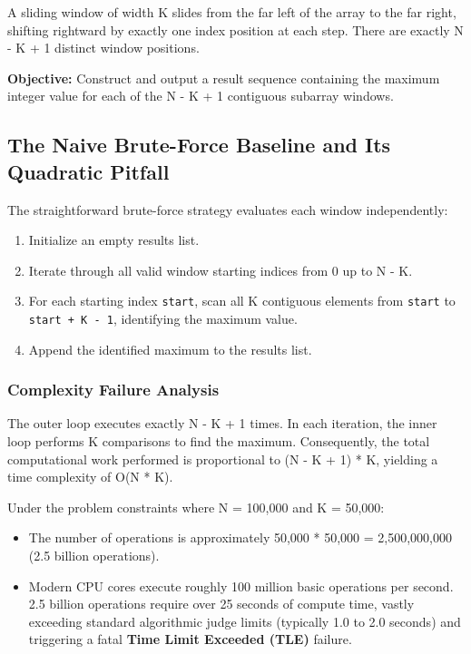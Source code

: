 \documentclass[10pt,journal,compsoc,onecolumn]{IEEEtran}
\begin{document}
A sliding window of width K slides from the far left of the array to the far right, shifting rightward by exactly one index position at each step. There are exactly N - K + 1 distinct window positions.

\textbf{Objective:} Construct and output a result sequence containing the maximum integer value for each of the N - K + 1 contiguous subarray windows.

\subsection{The Naive Brute-Force Baseline and Its Quadratic Pitfall}

The straightforward brute-force strategy evaluates each window independently:
\begin{enumerate}
    \item Initialize an empty results list.
    \item Iterate through all valid window starting indices from 0 up to N - K.
    \item For each starting index \texttt{start}, scan all K contiguous elements from \texttt{start} to \texttt{start + K - 1}, identifying the maximum value.
    \item Append the identified maximum to the results list.
\end{enumerate}

\subsubsection{Complexity Failure Analysis}
The outer loop executes exactly N - K + 1 times. In each iteration, the inner loop performs K comparisons to find the maximum. Consequently, the total computational work performed is proportional to (N - K + 1) * K, yielding a time complexity of O(N * K).

Under the problem constraints where N = 100,000 and K = 50,000:
\begin{itemize}
    \item The number of operations is approximately 50,000 * 50,000 = 2,500,000,000 (2.5 billion operations).
    \item Modern CPU cores execute roughly 100 million basic operations per second. 2.5 billion operations require over 25 seconds of compute time, vastly exceeding standard algorithmic judge limits (typically 1.0 to 2.0 seconds) and triggering a fatal \textbf{Time Limit Exceeded (TLE)} failure.
\end{itemize}
\end{document}

